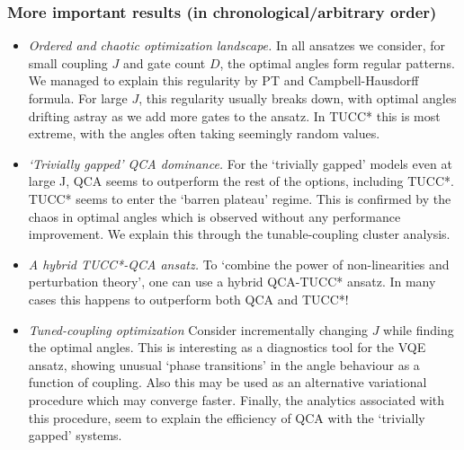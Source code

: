 \documentclass[10pt, a4paper]{article}
\begin{document}
\subsubsection*{More important results (in chronological/arbitrary order)}

\begin{itemize}
\item \textit{Ordered and chaotic optimization landscape.} In all ansatzes we consider, for small coupling $J$ and gate count $D$, the optimal angles form regular patterns. We managed to explain this regularity by PT and Campbell-Hausdorff formula. For large $J$, this regularity usually breaks down, with optimal angles drifting astray as we add more gates to the ansatz. In TUCC* this is most extreme, with the angles often taking seemingly random values. 
\item \textit{`Trivially gapped' QCA dominance.} For the `trivially gapped' models even at large J, QCA seems to outperform the rest of the options, including TUCC*. TUCC* seems to enter the `barren plateau' regime. This is confirmed by the chaos in optimal angles which is observed without any performance improvement. We explain this through the tunable-coupling cluster analysis.
\item \textit{A hybrid TUCC*-QCA ansatz.} To `combine the power of non-linearities and perturbation theory', one can use a hybrid QCA-TUCC* ansatz. In many cases this happens to outperform both QCA and TUCC*!
\item \textit{Tuned-coupling optimization} Consider incrementally changing $J$ while finding the optimal angles. This is interesting as a diagnostics tool for the VQE ansatz, showing unusual `phase transitions' in the angle behaviour as a function of coupling. Also this may be used as an alternative variational procedure which may converge faster. Finally, the analytics associated with this procedure, seem to explain the efficiency of QCA with the `trivially gapped' systems.
\end{itemize}
\end{document}

